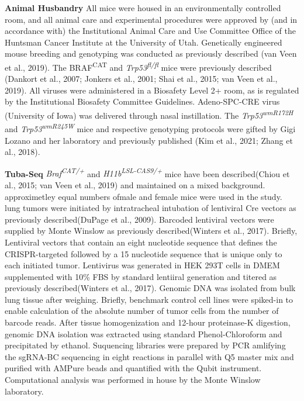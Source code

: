 \textbf{Animal Husbandry} All mice were housed in an environmentally controlled room, and all animal care and experimental procedures were approved by (and in accordance with) the Institutional Animal Care and Use Committee Office of the Huntsman Cancer Institute at the University of Utah. Genetically engineered mouse breeding and genotyping was conducted as previously described (van Veen et al., 2019). The BRAF\textsuperscript{CAT} and \emph{Trp53\textsuperscript{fl/fl}} mice were previously described (Dankort et al., 2007; Jonkers et al., 2001; Shai et al., 2015; van Veen et al., 2019). All viruses were administered in a Biosafety Level 2+ room, as is regulated by the Institutional Biosafety Committee Guidelines. Adeno-SPC-CRE virus (University of Iowa) was delivered through nasal instillation. The \emph{Trp53\textsuperscript{wmR172H}} and \emph{Trp53\textsuperscript{wmR245W}} mice and respective genotyping protocols were gifted by Gigi Lozano and her laboratory and previously published (Kim et al., 2021; Zhang et al., 2018).

\textbf{Tuba-Seq} \emph{Braf\textsuperscript{CAT/+}} and \emph{H11b\textsuperscript{LSL-CAS9/+}} mice have been described(Chiou et al., 2015; van Veen et al., 2019) and maintained on a mixed background. approximetley equal numbers ofmale and female mice were used in the study. lung tumors were initiated by intratracheal intubation of lentiviral Cre vectors as previously described(DuPage et al., 2009). Barcoded lentiviral vectors were supplied by Monte Winslow as previously described(Winters et al., 2017). Briefly, Lentiviral vectors that contain an eight nucleotide sequence that defines the CRISPR-targeted followed by a 15 nucleotide sequence that is unique only to each initiated tumor. Lentivirus was generated in HEK 293T cells in DMEM supplemented with 10\% FBS by standard lentiiral generation and titered as previously described(Winters et al., 2017). Genomic DNA was isolated from bulk lung tissue after weighing. Briefly, benchmark control cell lines were spiked-in to enable calculation of the absolute number of tumor cells from the number of barcode reads. After tissue homogenization and 12-hour proteinase-K digestion, genomic DNA isolation was extracted using standard Phenol-Chloroform and precipitated by ethanol. Suquencing libraries were prepared by PCR amlifying the sgRNA-BC sequencing in eight reactions in parallel with Q5 master mix and purified with AMPure beads and quantified with the Qubit instrument. Computational analysis was performed in house by the Monte Winslow laboratory.

